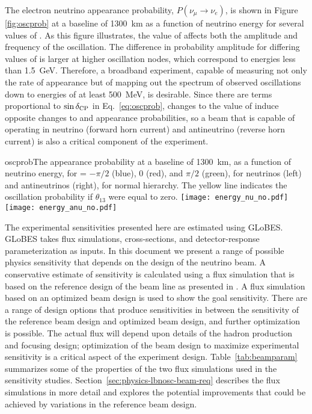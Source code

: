 The electron neutrino appearance probability, $P(\nu_\mu \rightarrow \nu_e)$, 
is shown in 
Figure \ref{fig:oscprob} 
at a baseline of 1300~km as a function of neutrino 
energy for several values of \deltacp. As this figure illustrates, the value 
of \deltacp affects both the amplitude and frequency of
the oscillation. The difference in probability amplitude
for differing values of \deltacp is larger at higher oscillation nodes, which 
correspond to energies less than 1.5~GeV. Therefore, a broadband experiment, 
capable of measuring not only the rate of \nue appearance but of mapping out the 
spectrum of observed oscillations down to energies of at least 500~MeV, 
is desirable. Since there are terms proportional to $\sin\mdeltacp$ in Eq.~\ref{eq:oscprob},
changes to the value of \deltacp induce opposite changes to \nue and
\anue appearance probabilities, so a beam that is capable of operating in
neutrino (forward horn current) and antineutrino (reverse horn current)
is also a critical component of the experiment.

\begin{cdrfigure}{oscprob}{The appearance probability at a baseline of 1300~km,
  as a function of neutrino energy, for \deltacp = $-\pi/2$ (blue), 
  0 (red), and $\pi/2$ (green), for neutrinos (left) and antineutrinos
  (right), for normal hierarchy. The yellow line indicates the oscillation
  probability if $\theta_{13}$ were equal to zero.}
\texttt{[image: energy\_nu\_no.pdf]}
\texttt{[image: energy\_anu\_no.pdf]}
\end{cdrfigure}

The experimental sensitivities presented here are estimated using 
GLoBES\cite{Huber:2004ka,Huber:2007ji}. GLoBES takes flux simulations, cross-sections,
and detector-response parameterization as inputs. In this document we present
a range of possible physics sensitivity that depends on the design of the neutrino beam.
A conservative estimate of sensitivity is calculated using a flux simulation that is based on the reference design of the beam line as presented in \vollbnf.  A flux simulation based on an optimized beam design is used to show the goal sensitivity.  There are a range of design options that produce sensitivities in between the sensitivity of the reference beam design and optimized beam design, and further optimization is possible. The actual flux will depend upon details of the hadron production and focusing design; optimization of the beam design to maximize experimental sensitivity is a critical aspect of the experiment
design.  Table~\ref{tab:beamparam} summarizes some of the properties of the two flux simulations used in the sensitivity studies.  Section~\ref{sec:physics-lbnosc-beam-req} describes the flux simulations in more detail and explores the potential improvements that could be achieved by variations in the reference beam design.

